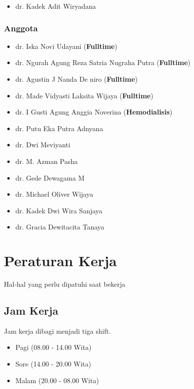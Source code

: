 \documentclass[
]{book}
\providecommand{\tightlist}{%
  \setlength{\itemsep}{0pt}\setlength{\parskip}{0pt}}
\begin{document}
\begin{itemize}
\tightlist
\item
  dr. Kadek Adit Wiryadana
\end{itemize}

\hypertarget{anggota}{%
\subsection{Anggota}\label{anggota}}

\begin{itemize}
\tightlist
\item
  dr. Iska Novi Udayani (\textbf{Fulltime})
\item
  dr. Ngurah Agung Reza Satria Nugraha Putra (\textbf{Fulltime})
\item
  dr. Agustin J Nanda De niro (\textbf{Fulltime})
\item
  dr. Made Vidyasti Laksita Wijaya (\textbf{Fulltime})
\item
  dr. I Gusti Agung Anggia Noverina (\textbf{Hemodialisis})
\item
  dr. Putu Eka Putra Adnyana
\item
  dr. Dwi Meviyanti
\item
  dr. M. Azman Pasha
\item
  dr. Gede Dewagama M
\item
  dr. Michael Oliver Wijaya
\item
  dr. Kadek Dwi Wira Sanjaya
\item
  dr. Gracia Dewitacita Tanaya
\end{itemize}

\hypertarget{peraturan-kerja}{%
\chapter{Peraturan Kerja}\label{peraturan-kerja}}

Hal-hal yang perlu dipatuhi saat bekerja

\hypertarget{jam-kerja}{%
\section{Jam Kerja}\label{jam-kerja}}

Jam kerja dibagi menjadi tiga shift.

\begin{itemize}
\item
  Pagi (08.00 - 14.00 Wita)
\item
  Sore (14.00 - 20.00 Wita)
\item
  Malam (20.00 - 08.00 Wita)
\end{itemize}
\end{document}
